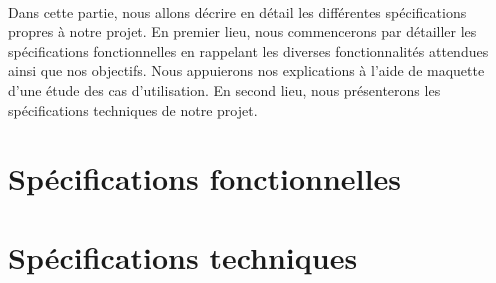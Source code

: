 \paragraph{}
	Dans cette partie, nous allons décrire en détail les différentes spécifications propres à notre projet. En premier lieu, nous commencerons par détailler les spécifications fonctionnelles en rappelant les diverses fonctionnalités attendues ainsi que nos objectifs. Nous appuierons nos explications à l'aide de maquette d'une étude des cas d'utilisation. En second lieu, nous présenterons les spécifications techniques de notre projet.

\section{Spécifications fonctionnelles}






\section{Spécifications techniques}

